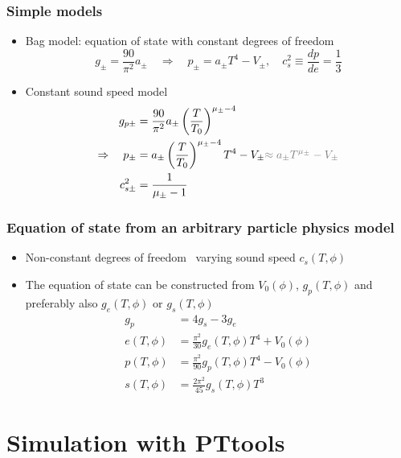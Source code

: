\begin{frame}
    \frametitle{Simple models}
    \begin{itemize}
        \item Bag model: equation of state with constant degrees of freedom
        \begin{equation}
            g_\pm = \frac{90}{\pi^2} a_\pm \quad \Rightarrow \quad p_\pm = a_\pm T^4 - V_\pm, \quad
            c_s^2 \equiv \frac{dp}{de} = \frac{1}{3}
        \end{equation}
        \item Constant sound speed model
        \begin{align}
            g_{p\pm} &= \frac{90}{\pi^2} a_\pm \left( \frac{T}{T_0} \right)^{\mu_\pm - 4} \\
            \Rightarrow \quad
            p_\pm &= a_\pm \left( \frac{T}{T_0} \right)^{\mu_\pm - 4} T^4 - V_\pm {\color{gray} \approx a_\pm T^{\mu_\pm} - V_\pm } \\
            c_{s\pm}^2 &= \frac{1}{\mu_\pm - 1}
        \end{align}
    \end{itemize}
\end{frame}

\begin{frame}
    \frametitle{Equation of state from an arbitrary particle physics model}
    \begin{itemize}
        \item Non-constant degrees of freedom \textrightarrow \ varying sound speed $c_s(T,\phi)$
        \item The equation of state can be constructed from $V_0(\phi)$, $g_p(T,\phi)$ and preferably also $g_e(T,\phi)$ or $g_s(T,\phi)$
        \begin{align}
            g_p &= 4g_s - 3g_e \\
            e(T,\phi) &= \frac{\pi^2}{30} g_e(T,\phi) T^4 + V_0(\phi) \\
            p(T,\phi) &= \frac{\pi^2}{90} g_p(T,\phi) T^4 - V_0(\phi) \\
            s(T,\phi) &= \frac{2\pi^2}{45} g_s(T,\phi) T^3
        \end{align}
    \end{itemize}
\end{frame}

\section{Simulation with PTtools}


